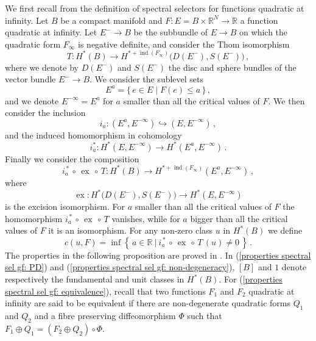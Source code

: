 \documentclass{amsart}
\DeclareMathOperator{\ex}{ex}
\DeclareMathOperator{\ind}{ind}
\theoremstyle{remark}
\begin{document}
We first recall from \cite{Viterbo}
the definition of spectral selectors
for functions quadratic at infinity.
Let $B$ be a compact manifold
and $F: E = B \times \mathbb{R}^N \rightarrow \mathbb{R}$
a function quadratic at infinity.
Let $E^- \rightarrow B$ be the subbundle of $E \rightarrow B$
on which the quadratic form $F_{\infty}$
is negative definite,
and consider the Thom isomorphism
\[
T: H^{\ast}(B) \rightarrow H^{\ast + \ind(F_{\infty})} \big( D(E^-), S(E^-) \big) \,,
\]
where we denote by $D(E^-)$ and $S(E^-)$ the disc and sphere bundles
of the vector bundle $E^- \rightarrow B$.
We consider the sublevel sets
\[
E^{a} = \{\, e \in E \;\lvert\; F(e) \leq a \,\} \,,
\]
and we denote $E^{-\infty} = E^{a}$
for $a$ smaller than all the critical values of $F$.
We then consider the inclusion
\[
i_a: (E^{a}, E^{-\infty}) \hookrightarrow (E, E^{-\infty}) \,,
\]
and the induced homomorphism in cohomology
\[
i_a^{\ast}: H^{\ast} (E, E^{-\infty}) \rightarrow H^{\ast} (E^{a}, E^{-\infty}) \,.
\]
Finally we consider the composition
\[
i_a^{\,\ast} \,\circ\, \ex \,\circ\, T:
H^{\ast} (B) \rightarrow H^{\ast + \ind (F_{\infty})} (E^{a}, E^{-\infty}) \,,
\]
where
\[
\ex: H^{\ast} \big( D(E^-), S(E^-) \big) \rightarrow H^{\ast} (E, E^{-\infty})
\]
is the excision isomorphism.
For $a$ smaller than all the critical values of $F$
the homomorphism $i_a^{\,\ast} \,\circ\, \ex \,\circ\, T$ vanishes,
while for $a$ bigger than all the critical values of $F$
it is an isomorphism.
For any non-zero class $u$ in $H^{\ast}(B)$ we define
$$
c(u,F) = \inf \left\{\, a \in \mathbb{R} ~|~
i_a^{\, \ast} \,\circ\, \ex \,\circ\, T \, (u) \neq 0 \,\right\} \,.
$$
The properties in the following proposition
are proved in \cite{Viterbo}.
In (\ref{properties spectral sel gf: PD})
and (\ref{properties spectral sel gf: non-degeneracy}),
$[B]$ and $1$ denote respectively
the fundamental and unit classes in $H^{\ast}(B)$.
For (\ref{properties spectral sel gf: equivalence}),
recall that two functions $F_1$ and $F_2$ quadratic at infinity
are said to be equivalent
if there are non-degenerate quadratic forms $Q_1$ and $Q_2$
and a fibre preserving diffeomorphism $\Phi$
such that $F_1 \oplus Q_1 = (F_2 \oplus Q_2) \circ \Phi$.
\end{document}
